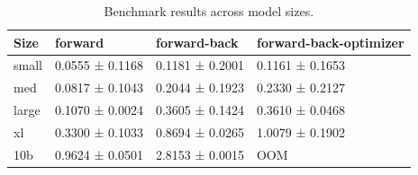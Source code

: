 \begin{table}
\caption{Benchmark results across model sizes.}
\label{tab:model-benchmark-results}
\begin{tabular}{llll}
\toprule
Size & forward & forward-back & forward-back-optimizer \\
\midrule
small & 0.0555 ± 0.1168 & 0.1181 ± 0.2001 & 0.1161 ± 0.1653 \\
med & 0.0817 ± 0.1043 & 0.2044 ± 0.1923 & 0.2330 ± 0.2127 \\
large & 0.1070 ± 0.0024 & 0.3605 ± 0.1424 & 0.3610 ± 0.0468 \\
xl & 0.3300 ± 0.1033 & 0.8694 ± 0.0265 & 1.0079 ± 0.1902 \\
10b & 0.9624 ± 0.0501 & 2.8153 ± 0.0015 & OOM \\
\bottomrule
\end{tabular}
\end{table}
